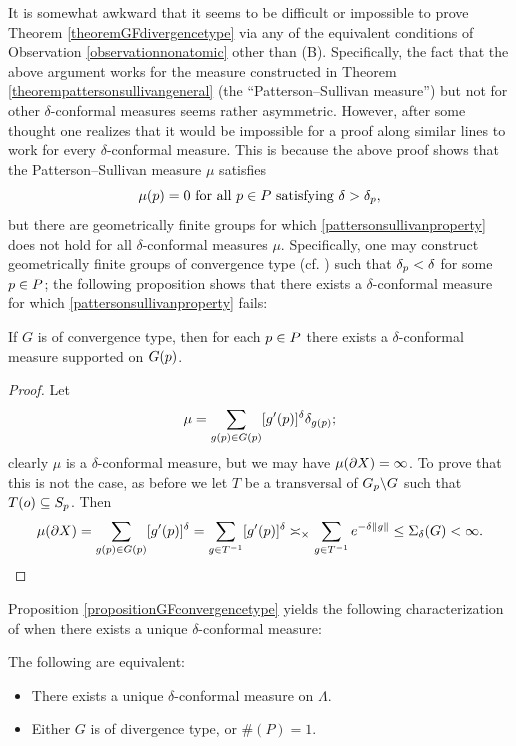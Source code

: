 \begin{remark}
It is somewhat awkward that it seems to be difficult or impossible to prove Theorem \ref{theoremGFdivergencetype} via any of the equivalent conditions of Observation \ref{observationnonatomic} other than (B). Specifically, the fact that the above argument works for the measure constructed in Theorem \ref{theorempattersonsullivangeneral} (the ``Patterson--Sullivan measure'') but not for other $\delta$-conformal measures seems rather asymmetric. However, after some thought one realizes that it would be impossible for a proof along similar lines to work for every $\delta$-conformal measure. This is because the above proof shows that the Patterson--Sullivan measure $\mu$ satisfies
\begin{equation}
\label{pattersonsullivanproperty}
\textup{$\mu(p) = 0$ for all $p\in P$ satisfying $\delta > \delta_p$},
\end{equation}
but there are geometrically finite groups for which \eqref{pattersonsullivanproperty} does not hold for all $\delta$-conformal measures $\mu$. Specifically, one may construct geometrically finite groups of convergence type (cf. \cite[Th\'eor\`eme C]{DOP}) such that $\delta_p < \delta$ for some $p\in P$; the following proposition shows that there exists a $\delta$-conformal measure for which \eqref{pattersonsullivanproperty} fails:
\end{remark}

\begin{proposition}
\label{propositionGFconvergencetype}
If $G$ is of convergence type, then for each $p\in P$ there exists a $\delta$-conformal measure supported on $G(p)$.
\end{proposition}
\begin{proof}
Let
\[
\mu = \sum_{g(p)\in G(p)} [g'(p)]^\delta \delta_{g(p)};
\]
clearly $\mu$ is a $\delta$-conformal measure, but we may have $\mu(\partial X) = \infty$. To prove that this is not the case, as before we let $T$ be a transversal of $G_p\backslash G$ such that $T(o)\subseteq S_p$. Then
\[
\mu(\partial X) = \sum_{g(p)\in G(p)} [g'(p)]^\delta = \sum_{g\in T^{-1}} [g'(p)]^\delta \asymp_\times \sum_{g\in T^{-1}} e^{-\delta\|g\|} \leq \Sigma_\delta(G) < \infty.
\]
\end{proof}
Proposition \ref{propositionGFconvergencetype} yields the following characterization of when there exists a unique $\delta$-conformal measure:
\begin{corollary}
\label{corollaryuniquenesscharacterization}
The following are equivalent:
\begin{itemize}
\item[(A)] There exists a unique $\delta$-conformal measure on $\Lambda$.
\item[(B)] Either $G$ is of divergence type, or $\#(P) = 1$.
\end{itemize}
\end{corollary}

